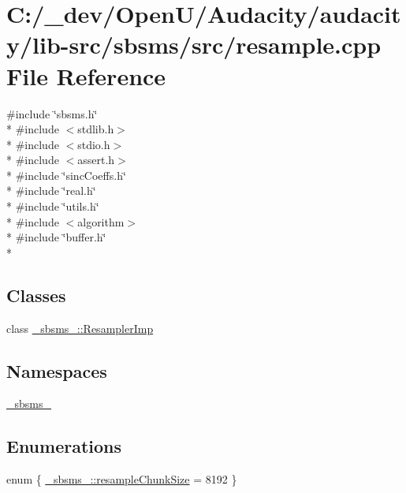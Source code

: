 \hypertarget{lib-src_2sbsms_2src_2resample_8cpp}{}\section{C\+:/\+\_\+dev/\+Open\+U/\+Audacity/audacity/lib-\/src/sbsms/src/resample.cpp File Reference}
\label{lib-src_2sbsms_2src_2resample_8cpp}
{\ttfamily \#include \char`\"{}sbsms.\+h\char`\"{}}\\*
{\ttfamily \#include $<$stdlib.\+h$>$}\\*
{\ttfamily \#include $<$stdio.\+h$>$}\\*
{\ttfamily \#include $<$assert.\+h$>$}\\*
{\ttfamily \#include \char`\"{}sinc\+Coeffs.\+h\char`\"{}}\\*
{\ttfamily \#include \char`\"{}real.\+h\char`\"{}}\\*
{\ttfamily \#include \char`\"{}utils.\+h\char`\"{}}\\*
{\ttfamily \#include $<$algorithm$>$}\\*
{\ttfamily \#include \char`\"{}buffer.\+h\char`\"{}}\\*
\subsection*{Classes}
\begin{DoxyCompactItemize}
\item 
class \hyperlink{class__sbsms___1_1_resampler_imp}{\+\_\+sbsms\+\_\+\+::\+Resampler\+Imp}
\end{DoxyCompactItemize}
\subsection*{Namespaces}
\begin{DoxyCompactItemize}
\item 
 \hyperlink{namespace__sbsms__}{\+\_\+sbsms\+\_\+}
\end{DoxyCompactItemize}
\subsection*{Enumerations}
\begin{DoxyCompactItemize}
\item 
enum \{ \hyperlink{namespace__sbsms___a63a4ac6396ce2a0b95d3fd234eb362fca71871c0b75ab2583bef18af369bd50a4}{\+\_\+sbsms\+\_\+\+::resample\+Chunk\+Size} = 8192
 \}
\end{DoxyCompactItemize}

